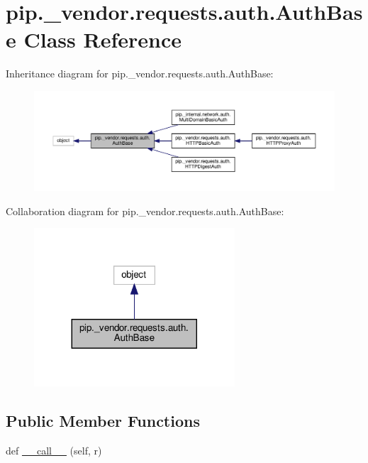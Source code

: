 \hypertarget{classpip_1_1__vendor_1_1requests_1_1auth_1_1AuthBase}{}\section{pip.\+\_\+vendor.\+requests.\+auth.\+Auth\+Base Class Reference}
\label{classpip_1_1__vendor_1_1requests_1_1auth_1_1AuthBase}


Inheritance diagram for pip.\+\_\+vendor.\+requests.\+auth.\+Auth\+Base\+:
\nopagebreak
\begin{figure}[H]
\begin{center}
\leavevmode
\includegraphics[width=350pt]{classpip_1_1__vendor_1_1requests_1_1auth_1_1AuthBase__inherit__graph}
\end{center}
\end{figure}


Collaboration diagram for pip.\+\_\+vendor.\+requests.\+auth.\+Auth\+Base\+:
\nopagebreak
\begin{figure}[H]
\begin{center}
\leavevmode
\includegraphics[width=212pt]{classpip_1_1__vendor_1_1requests_1_1auth_1_1AuthBase__coll__graph}
\end{center}
\end{figure}
\subsection*{Public Member Functions}
\begin{DoxyCompactItemize}
\item 
def \hyperlink{classpip_1_1__vendor_1_1requests_1_1auth_1_1AuthBase_ac1d7aed0047833e39afd6e78fbb9ae73}{\+\_\+\+\_\+call\+\_\+\+\_\+} (self, r)
\end{DoxyCompactItemize}


